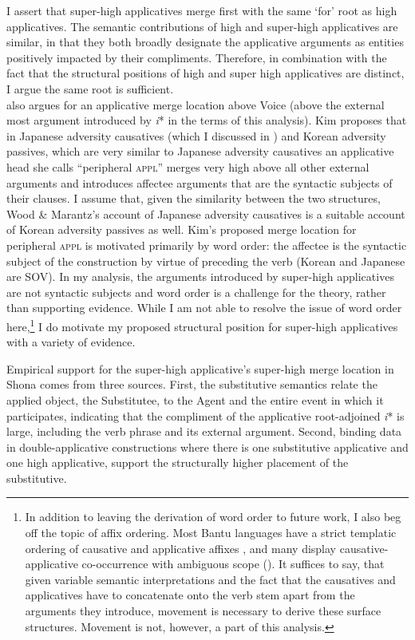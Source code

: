 \documentclass[output=paper,modfonts,nonflat]{langsci/langscibook}
\begin{document}
I assert that super-high applicatives merge first with the same ‘for’ root as high applicatives. The semantic contributions of high and super-high applicatives are similar, in that they both broadly designate the applicative arguments as entities positively impacted by their compliments. Therefore, in combination with the fact that the structural positions of high and super high applicatives are distinct, I argue the same root is sufficient.\\

\citet{Kim2011,Kim2012} also argues for an applicative merge location above Voice (above the external most argument introduced by \textit{i}* in the terms of this analysis). Kim proposes that in Japanese adversity causatives (which I discussed in ) and Korean adversity passives, which are very similar to Japanese adversity causatives an applicative head she calls “peripheral \textsc{appl}” merges very high above all other external arguments and introduces affectee arguments that are the syntactic subjects of their clauses. I assume that, given the similarity between the two structures, Wood \& Marantz’s account of Japanese adversity causatives is a suitable account of Korean adversity passives as well. Kim’s proposed merge location for peripheral \textsc{appl} is motivated primarily by word order: the affectee is the syntactic subject of the construction by virtue of preceding the verb (Korean and Japanese are SOV). In my analysis, the arguments introduced by super-high applicatives are not syntactic subjects and word order is a challenge for the theory, rather than supporting evidence. While I am not able to resolve the issue of word order here,\footnote{In addition to leaving the derivation of word order to future work, I also beg off the topic of affix ordering. Most Bantu languages have a strict templatic ordering of causative and applicative affixes \citep{Good2005}, and many display causative-applicative co-occurrence with ambiguous scope (\citealt{Baker1985,Hyman2002}). It suffices to say, that given variable semantic interpretations and the fact that the causatives and applicatives have to concatenate onto the verb stem apart from the arguments they introduce, movement is necessary to derive these surface structures. Movement is not, however, a part of this analysis.}  I do motivate my proposed structural position for super-high applicatives with a variety of evidence. 



Empirical support for the super-high applicative’s super-high merge location in Shona comes from three sources. First, the substitutive semantics relate the applied object, the Substitutee, to the Agent and the entire event in which it participates, indicating that the compliment of the applicative root-adjoined \textit{i}* is large, including the verb phrase and its external argument.  Second, binding data in double-applicative constructions where there is one substitutive applicative and one high applicative, support the structurally higher placement of the substitutive. 
\end{document}
